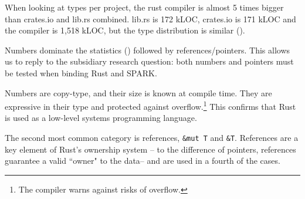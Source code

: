 \documentclass[nomenclature, english, bibtex]{kththesis}
\newcommand{\inlinecode}[1]{\texttt{#1}}
\begin{document}
When looking at types per project, the rust compiler is almost 5 times bigger than crates.io and lib.rs combined. 
lib.rs is 172 k\gls{LOC}, crates.io is 171 kLOC and the compiler is 1,518 kLOC, but the type distribution is similar (). 

Numbers dominate the statistics () followed by references/pointers. This allows us to reply to the subsidiary research question: both numbers and pointers must be tested when binding Rust and SPARK.

Numbers are \gls{copy-type}, and their size is known at compile time. They are expressive in their type and protected against overflow.\footnote{The compiler warns against risks of overflow.} This confirms that Rust is used as a low-level systems programming language. 

The second most common category is references, \inlinecode{\&mut T} and \inlinecode{\&T}. References are a key element of Rust's ownership system -- to the difference of pointers, references guarantee a valid ``owner" to the data-- and are used in a fourth of the cases. 

\end{document}
